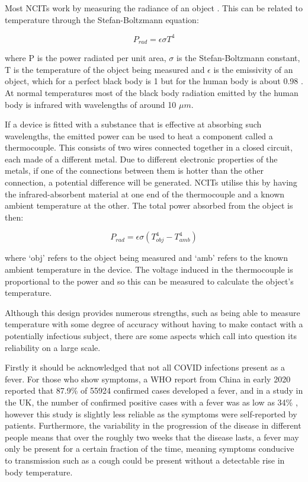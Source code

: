 \documentclass[11pt]{report}
\begin{document}
Most NCITs work by measuring the radiance of an object \cite{ir4}. This can be related to temperature through the Stefan-Boltzmann equation:

\begin{equation}
    P_{rad} = \epsilon{}\sigma{}T^{4}
\end{equation}

where P is the power radiated per unit area, $\sigma{}$ is the Stefan-Boltzmann constant, T is the temperature of the object being measured and $\epsilon$ is the emissivity of an object, which for a perfect black body is 1 but for the human body is about 0.98 \cite{ir5}. At normal temperatures most of the black body radiation emitted by the human body is infrared with wavelengths of around 10 $\mu{}m$.

If a device is fitted with a substance that is effective at absorbing such wavelengths, the emitted power can be used to heat a component called a thermocouple. This consists of two wires connected together in a closed circuit, each made of a different metal. Due to different electronic properties of the metals, if one of the connections between them is hotter than the other connection, a potential difference will be generated. NCITs utilise this by having the infrared-absorbent material at one end of the thermocouple and a known ambient temperature at the other. The total power absorbed from the object is then:

\begin{equation}
    P_{rad}=\epsilon{}\sigma{}(T^{4}_{obj}-T^{4}_{amb})
\end{equation}

where ‘obj’ refers to the object being measured and ‘amb’ refers to the known ambient temperature in the device. The voltage induced in the thermocouple is proportional to the power and so this can be measured to calculate the object’s temperature.

Although this design provides numerous strengths, such as being able to measure temperature with some degree of accuracy without having to make contact with a potentially infectious subject, there are some aspects which call into question its reliability on a large scale.

Firstly it should be acknowledged that not all COVID infections present as a fever. For those who show symptoms, a WHO report from China in early 2020 \cite{ir6} reported that 87.9\% of 55924 confirmed cases developed a fever, and in a study in the UK, the number of confirmed positive cases with a fever was as low as 34\% \cite{ir7}, however this study is slightly less reliable as the symptoms were self-reported by patients. Furthermore, the variability in the progression of the disease in different people means that over the roughly two weeks that the disease lasts, a fever may only be present for a certain fraction of the time, meaning symptoms conducive to transmission such as a cough could be present without a detectable rise in body temperature.
\end{document}
